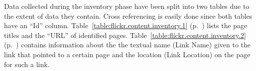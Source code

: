 %

Data collected during the inventory phase have been split into two tables due
to the extent of data they contain. Cross referencing is easily done since
both tables have an ``Id'' column.
Table~\ref{table:flickr.content.inventory.1}
(p.~\pageref{table:flickr.content.inventory.1}) lists the page titles and
the ``URL'' of identified pages. 
Table~\ref{table:flickr.content.inventory.2}
(p.~\pageref{table:flickr.content.inventory.2}) contains information about the
the textual name (Link Name) given to the link that pointed to a certain page
and the location (Link Location) on the page for such a link.

\setlength{}
  \let\LTright\LTleft

